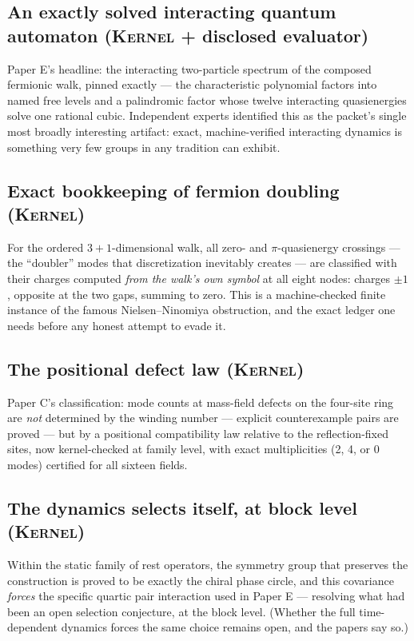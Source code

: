 \documentclass[11pt]{article}
\newcommand{\Kernel}{\textcolor{kernelcolor}{\textsc{Kernel}}}
\begin{document}
\subsection{An exactly solved interacting quantum automaton (\Kernel{} + disclosed evaluator)}

Paper E's headline: the interacting two-particle spectrum of the composed
fermionic walk, pinned exactly --- the characteristic polynomial factors
into named free levels and a palindromic factor whose twelve interacting
quasienergies solve one rational cubic.  Independent experts identified
this as the packet's single most broadly interesting artifact: exact,
machine-verified interacting dynamics is something very few groups in any
tradition can exhibit.

\subsection{Exact bookkeeping of fermion doubling (\Kernel)}

For the ordered $3{+}1$-dimensional walk, all zero- and $\pi$-quasienergy
crossings --- the ``doubler'' modes that discretization inevitably creates
--- are classified with their charges computed \emph{from the walk's own
symbol} at all eight nodes: charges $\pm1$, opposite at the two gaps,
summing to zero.  This is a machine-checked finite instance of the famous
Nielsen--Ninomiya obstruction, and the exact ledger one needs before any
honest attempt to evade it.

\subsection{The positional defect law (\Kernel)}

Paper C's classification: mode counts at mass-field defects on the
four-site ring are \emph{not} determined by the winding number ---
explicit counterexample pairs are proved --- but by a positional
compatibility law relative to the reflection-fixed sites, now
kernel-checked at family level, with exact multiplicities (2, 4, or 0
modes) certified for all sixteen fields.

\subsection{The dynamics selects itself, at block level (\Kernel)}

Within the static family of rest operators, the symmetry group that
preserves the construction is proved to be exactly the chiral phase
circle, and this covariance \emph{forces} the specific quartic pair
interaction used in Paper E --- resolving what had been an open selection
conjecture, at the block level.  (Whether the full time-dependent dynamics
forces the same choice remains open, and the papers say so.)
\end{document}
